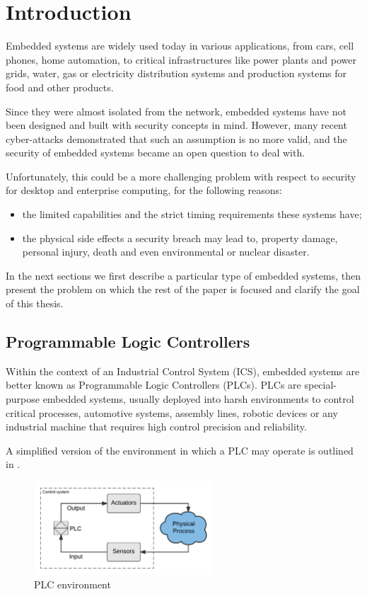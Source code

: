 \chapter{Introduction}
\label{chap:intro}

Embedded systems are widely used today in various applications, from cars, cell phones, home automation, to critical infrastructures
like power plants and power grids, water, gas or electricity distribution systems and production systems for food and other products.

Since they were almost isolated from the network, embedded systems have not been designed and built with security concepts in mind.
However, many recent cyber-attacks demonstrated that such an assumption is no more valid, and the security of embedded systems became an open question to deal with.

Unfortunately, this could be a more challenging problem with respect to security for desktop and enterprise computing, for the following reasons:
\begin{itemize}[itemsep=2pt,topsep=0pt]
	\item the limited capabilities and the strict timing requirements these systems have;
	\item the physical side effects a security breach may lead to, \eg property damage, personal injury, death and even environmental or nuclear disaster.
\end{itemize}

In the next sections we first describe a particular type of embedded systems, then present the problem on which the rest of the paper is focused
and clarify the goal of this thesis.


\section{Programmable Logic Controllers}

Within the context of an Industrial Control System (ICS), embedded systems are better known as Programmable Logic Controllers (PLCs).
PLCs are special-purpose embedded systems, usually deployed into harsh environments to control critical processes,
\eg automotive systems, assembly lines, robotic devices or any industrial machine that requires high control precision and reliability.

A simplified version of the environment in which a PLC may operate is outlined in \myfig{\ref{fig:plc_env}}.
\begin{figure}[h]
\centerline{\includegraphics[width=0.6\textwidth]{res/plc_env}}
\caption{PLC environment\label{fig:plc_env}}
\end{figure}

